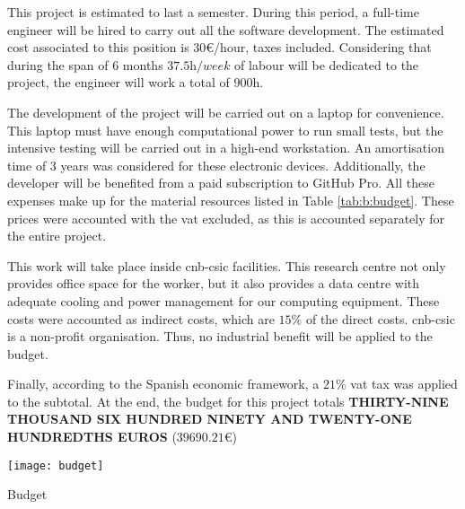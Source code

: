 \documentclass[../main.tex]{subfiles}
\begin{document}
This project is estimated to last a semester. During this period, a full-time engineer will be hired to carry out all the software development. The estimated cost associated to this position is $30$\euro/hour, taxes included. Considering that during the span of 6 months $37.5 \si{\hour/week}$ of labour will be dedicated to the project, the engineer will work a total of $900 \si{\hour}$.

The development of the project will be carried out on a laptop for convenience. This laptop must have enough computational power to run small tests, but the intensive testing will be carried out in a high-end workstation. An amortisation time of 3 years was considered for these electronic devices. Additionally, the developer will be benefited from a paid subscription to GitHub Pro. All these expenses make up for the material resources listed in Table \ref{tab:b:budget}. These prices were accounted with the \gls{vat} excluded, as this is accounted separately for the entire project.

This work will take place inside \gls{cnb}-\gls{csic} facilities. This research centre not only provides office space for the worker, but it also provides a data centre with adequate cooling and power management for our computing equipment. These costs were accounted as indirect costs, which are $15 \si{\percent}$ of the direct costs. \Gls{cnb}-\gls{csic} is a non-profit organisation. Thus, no industrial benefit will be applied to the budget.

Finally, according to the Spanish economic framework, a $21 \si{\percent}$ \gls{vat} tax was applied to the subtotal. At the end, the budget for this project totals \textbf{THIRTY-NINE THOUSAND SIX HUNDRED NINETY AND TWENTY-ONE HUNDREDTHS EUROS} ($39690.21$\euro)

\begin{table}[htbp]
    \centering
    \texttt{[image: budget]}
    \caption{Budget}
    \label{tab:b:budget}
\end{table}
\end{document}
